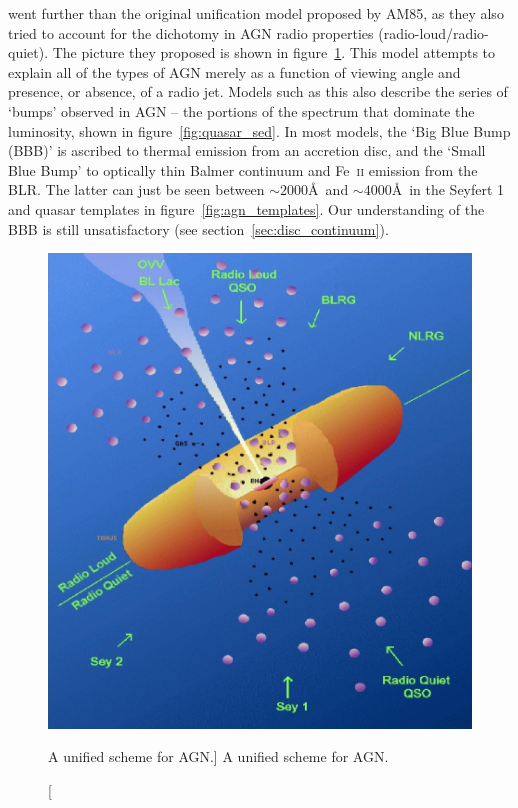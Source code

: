 \cite[][UP95]{UP95} went further than the original unification model
proposed by AM85, as they also tried to account for the dichotomy in 
AGN radio properties (radio-loud/radio-quiet).
The picture they proposed is shown in figure~\ref{fig:unification}.
This model attempts to explain all of the types of AGN 
merely as a function of viewing angle
and presence, or absence, of a radio jet. Models such as this also 
describe the series of `bumps' observed in AGN -- the portions
of the spectrum that dominate the luminosity, shown in figure~\ref{fig:quasar_sed}. 
In most models, the `Big Blue Bump (BBB)' is ascribed to thermal 
emission from an accretion disc, and the `Small Blue Bump' to optically 
thin Balmer continuum and Fe~\textsc{ii} emission from the BLR.
The latter can just be seen between $\sim2000$\AA\ and 
$\sim4000$\AA\ in the Seyfert 1 and 
quasar templates in figure~\ref{fig:agn_templates}.
Our understanding of the BBB is still unsatisfactory 
(see section~\ref{sec:disc_continuum}).

\begin{figure}
\centering
\includegraphics[width=1.0\textwidth]{figures/01-intro/up95.png}
\caption
[A unified scheme for AGN.]
{
A unified scheme for AGN.
} 
\label{fig:unification}
\end{figure} 

